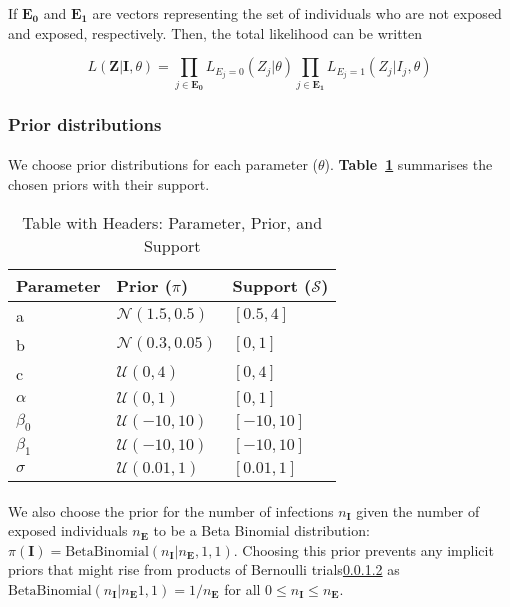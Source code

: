 \documentclass{article}
\begin{document}
If $\mathbf{E_0}$ and $\mathbf{E_1}$ are vectors representing the set of individuals who are not exposed and exposed, respectively. Then, the total likelihood can be written 

\begin{equation}
L(\mathbf{Z} | \mathbf{I}, \theta) = \prod_{j \in \mathbf{E_0}}L_{E_j = 0}(Z_{j}| \theta) \prod_{j \in \mathbf{E_1}}L_{E_j = 1}(Z_{j}| I_j, \theta) 
\end{equation}


\subsubsection{Prior distributions}

\paragraph{}We choose prior distributions for each parameter \pi($\theta$). \textbf{Table~\ref{tab:priorsA}} summarises the chosen priors with their support. 

\begin{table}[ht]
    \centering
    \begin{tabular}{|l|l|l|}
        \hline
        \textbf{Parameter} & \textbf{Prior ($\pi$)} & \textbf{Support ($\mathcal{S}$)} \\
        \hline
        a & $\mathcal{N}(1.5, 0.5)$ & $[0.5, 4]$ \\
        \hline
        b & $\mathcal{N}(0.3, 0.05)$ & $[0, 1]$ \\
        \hline
        c & $\mathcal{U}(0, 4)$ & $[0, 4]$ \\
        \hline
        $\alpha$ & $\mathcal{U}(0, 1)$ & $[0, 1]$ \\
        \hline
        $\beta_0$ & $\mathcal{U}(-10, 10)$ & $[-10, 10]$ \\
        \hline
        $\beta_1$ & $\mathcal{U}(-10, 10)$ & $[-10, 10]$ \\
        \hline
        $\sigma$ &  $\mathcal{U}(0.01, 1)$ & $[0.01, 1]$ \\
        \hline
    \end{tabular}
    \caption{Table with Headers: Parameter, Prior, and Support}
    \label{tab:priorsA}
\end{table}

\paragraph{}We also choose the prior for the number of infections $n_\mathbf{I}$ given the number of exposed individuals $n_\mathbf{E}$ to be a Beta Binomial distribution: $\pi(\mathbf{I}) = \text{BetaBinomial}(n_\mathbf{I} | n_\mathbf{E}, 1, 1)$. Choosing this prior prevents any implicit priors that might rise from products of Bernoulli trials\ref{} as $\text{BetaBinomial}(n_\mathbf{I} | n_\mathbf{E} 1, 1) = 1 / n_\mathbf{E}$ for all $0 \leq n_\mathbf{I} \leq n_\mathbf{E}$. 
\end{document}
